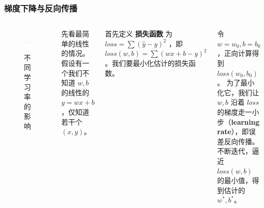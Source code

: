 \documentclass[mathserif,envcountsect,fontset=mac]{ctexbeamer}
\begin{document}
\begin{frame}
    \frametitle{梯度下降与反向传播}
    \begin{columns}
        \begin{figure}
            \centering
            \includegraphics[width=\linewidth]{../lib/lr.png}
            \label{learningrates}
            \caption{不同学习率的影响}
        \end{figure}
        先看最简单的线性的情况。假设有一个我们不知道 $w,b$ 的线性的 $y=wx+b$ ，仅知道若干个 $(x,y)$。

        首先定义 \textbf{损失函数} 为 $loss = \sum{(\hat{y}-y)^2}$ ，即 $loss(w, b)=\sum(wx+b-y)^2$ 。我们要最小化估计的损失函数。

        令 $w=w_0,b=b_0$ ，正向计算得到 $loss(w_0,b_0)$。
        为了最小化它，我们让 $w,b$ 沿着 $loss$ 的梯度走一小步（\textbf{learning rate}），即误差反向传播。
        不断迭代，逼近 $loss(w,b)$ 的最小值，得到估计的 $w^*,b^*$。
    \end{columns}
\end{frame}
\end{document}
